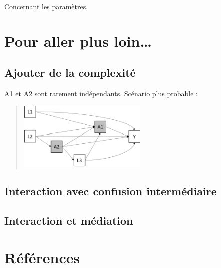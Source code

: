 \documentclass[
]{book}
\begin{document}
Concernant les paramètres,

\hypertarget{pour-aller-plus-loin}{%
\chapter{Pour aller plus loin\ldots{}}\label{pour-aller-plus-loin}}

\hypertarget{ajouter-de-la-complexituxe9}{%
\section{Ajouter de la complexité}\label{ajouter-de-la-complexituxe9}}

A1 et A2 sont rarement indépendants. Scénario plus probable :

\begin{quote}
\includegraphics[width=0.5\textwidth,height=\textheight]{img/Image11.png}
\end{quote}

\hypertarget{interaction-avec-confusion-intermuxe9diaire}{%
\section{Interaction avec confusion intermédiaire}\label{interaction-avec-confusion-intermuxe9diaire}}

\hypertarget{interaction-et-muxe9diation}{%
\section{Interaction et médiation}\label{interaction-et-muxe9diation}}

\citet{vanderweele_three-way_2013}

\citet{vanderweele_unification_2014}

\hypertarget{ruxe9fuxe9rences}{%
\chapter{Références}\label{ruxe9fuxe9rences}}

  
\end{document}
